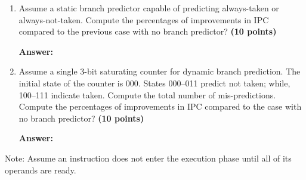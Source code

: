 \documentclass[a4paper, 11pt]{exam}
\begin{document}
\begin{enumerate}
\begin{enumerate}
\hfill

    \item  Assume a static branch predictor capable of predicting always-taken or always-not-taken. Compute the percentages of improvements in IPC compared to the previous case with no branch predictor? \textbf {(10 points)}
    
    \hfill
 
\textbf{Answer:} 

\hfill

   \item Assume a single 3-bit saturating counter for dynamic branch prediction. The initial state of the counter is 000. States 000--011 predict not taken; while, 100--111 indicate taken. Compute the total number of mis-predictions. Compute the percentages of improvements in IPC compared to the case with no branch predictor? \textbf {(10 points)}
   
   \hfill
 
\textbf{Answer:} 

\hfill

\end{enumerate}
Note: Assume an instruction does not enter the execution phase until all of its operands are ready.

\end{enumerate}
\end{document}
